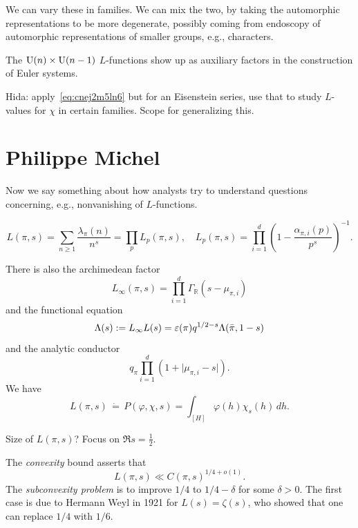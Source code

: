 \documentclass[reqno]{amsart} 
\begin{document}
We can vary these in families.  We can mix the two, by taking the automorphic representations to be more degenerate, possibly coming from endoscopy of automorphic representations of smaller groups, e.g., characters.

The $\operatorname{U}(n) \times \operatorname{U}(n-1)$ $L$-functions show up as auxiliary factors in the construction of Euler systems.

Hida: apply~\eqref{eq:cnej2m5ln6} but for an Eisenstein series, use that to study $L$-values for $\chi$ in certain families.  Scope for generalizing this.


\section{Philippe Michel}\label{sec:cnfhlpu3ct}
Now we say something about how analysts try to understand questions concerning, e.g., nonvanishing of $L$-functions.

\begin{equation*}
  L(\pi, s ) = \sum_{n \geq 1} \frac{\lambda_\pi(n)}{ n^s }
  = \prod_p L_p(\pi, s ),
  \quad
  L_p(\pi, s ) = \prod_{i = 1 }^d
  \left( 1 - \frac{\alpha_{\pi, i}(p)}{ p^s } \right)^{-1}.
\end{equation*}

There is also the archimedean factor
\begin{equation*}
  L _\infty(\pi, s) = \prod_{i = 1 }^d \Gamma_{\mathbb{R} } (s - \mu_{\pi, i })
\end{equation*}
and the functional equation
\begin{equation*}
  \Lambda(s) := L _\infty L(s) = \varepsilon(\pi) q^{1/2 - s} \Lambda(\bar{\pi}, 1 - s)
\end{equation*}
and the analytic conductor
\begin{equation*}
  q_\pi \prod_{i = 1 }^d \left( 1 + \lvert \mu_{\pi, i } - s \rvert \right).
\end{equation*}
We have
\begin{equation*}
  L(\pi, s ) \, \dot{=} \,
  P(\varphi, \chi, s)
  = \int_{[H]}
  \varphi(h) \chi_s(h) \, d h.
\end{equation*}

Size of $L(\pi, s)$?  Focus on $\Re s = \tfrac{1}{2}$.

The \emph{convexity} bound asserts that
\begin{equation*}
  L(\pi, s) \ll C(\pi, s )^{1/4 + o (1)}.
\end{equation*}
The \emph{subconvexity problem} is to improve $1/4$ to $1 /4 - \delta $ for some $\delta > 0$.  The first case is due to Hermann Weyl in 1921 for $L(s) = \zeta(s)$, who showed that one can replace $1/4$ with $1/6$.
\end{document}
